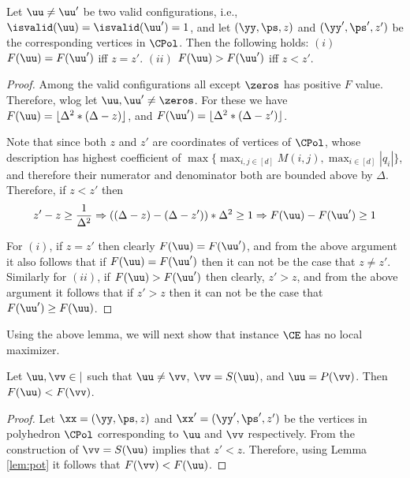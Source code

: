 \begin{lemma}\label{lem:pot}
Let $\uu \neq \uu'$ be two valid configurations, i.e., $\isvalid(\uu)=\isvalid(\uu')=1$, and let $(\yy,\ps,z)$ and $(\yy',\ps',z')$ be the corresponding vertices in $\CPol$. Then the following holds: $(i)$ $F(\uu)=F(\uu')$ iff $z=z'$. $(ii)$ $F(\uu)>F(\uu')$ iff $z<z'$.
\end{lemma}
\begin{proof}
Among the valid configurations all except $\zeros$ has positive $F$ value. Therefore, wlog let $\uu,\uu'\neq \zeros$. For these we have $F(\uu)=\lfloor \Delta^2*(\Delta -z)\rfloor$, and $F(\uu')=\lfloor \Delta^2*(\Delta -z')\rfloor$. 

Note that since both $z$ and $z'$ are coordinates of vertices of $\CPol$, whose description has highest coefficient of $\max\{\max_{i,j\in [d]} M(i,j),\max_{i\in [d]} |q_i|\}$, and therefore their numerator and denominator both are bounded above by $\Delta$. Therefore, if $z< z'$ then 
\[
z'-z\ge \frac{1}{\Delta^2} \Rightarrow ((\Delta-z) - (\Delta - z'))*\Delta^2 \ge 1 \Rightarrow F(\uu)-F(\uu') \ge 1
\]

For $(i)$, if $z=z'$ then clearly $F(\uu)=F(\uu')$, and from the above argument it also follows that if $F(\uu)= F(\uu')$ then it can not be the case that $z\neq z'$. Similarly for $(ii)$, if $F(\uu)>F(\uu')$ then clearly, $z'>z$, and from the above argument it follows that if $z'>z$ then it can not be the case that $F(\uu')\ge F(\uu)$. 
\end{proof}

Using the above lemma, we will next show that instance $\CE$ has no local maximizer. 

\begin{lemma}\label{lem:t}
Let $\uu,\vv \in \vert$ such that $\uu\neq \vv$, $\vv=S(\uu)$, and $\uu=P(\vv)$. Then $F(\uu)< F(\vv)$.
\end{lemma}
\begin{proof}
Let $\xx=(\yy,\ps,z)$ and $\xx'=(\yy',\ps',z')$ be the vertices in polyhedron $\CPol$ corresponding to $\uu$ and $\vv$ respectively. From the construction of $\vv=S(\uu)$ implies that $z'<z$. Therefore, using Lemma \ref{lem:pot} it follows that $F(\vv)<F(\uu)$.
\end{proof}

